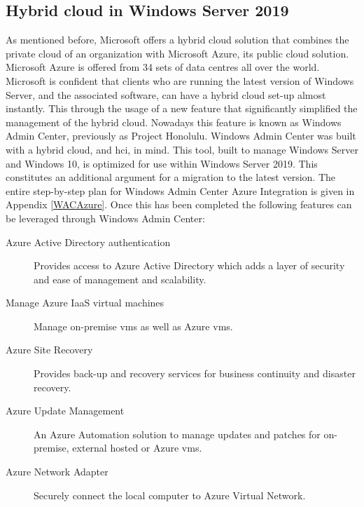 \subsection{Hybrid cloud in Windows Server 2019}
\label{hybrid-cloud-windows-server-2019}
As mentioned before, Microsoft offers a hybrid cloud solution that combines the private cloud of an organization with Microsoft Azure, its public cloud solution. Microsoft Azure is offered from 34 sets of data centres all over the world. Microsoft is confident that clients who are running the latest version of Windows Server, and the associated software, can have a hybrid cloud set-up almost instantly. This through the usage of a new feature that significantly simplified the management of the hybrid cloud. Nowadays this feature is known as Windows Admin Center, previously as Project Honolulu. Windows Admin Center was built with a hybrid cloud, and \acrshort{hci}, in mind. This tool, built to manage Windows Server and Windows 10, is optimized for use within Windows Server 2019. This constitutes an additional argument for a migration to the latest version. The entire step-by-step plan for Windows Admin Center Azure Integration is given in Appendix \ref{WACAzure}. Once this has been completed the following features \autocite{Washburn2018} can be leveraged through Windows Admin Center:
\begin{description}
\item [Azure Active Directory authentication] Provides access to Azure Active Directory which adds a layer of security and ease of management and scalability.
\item [Manage Azure IaaS virtual machines] Manage on-premise \acrshort{vm}s as well as Azure \acrshort{vm}s.
\item [Azure Site Recovery] Provides back-up and recovery services for business continuity and disaster recovery.
\item [Azure Update Management] An Azure Automation solution to manage updates and patches for on-premise, external hosted or Azure \acrshort{vm}s.
\item [Azure Network Adapter] Securely connect the local computer to Azure Virtual Network.
\end{description}

\clearpage

